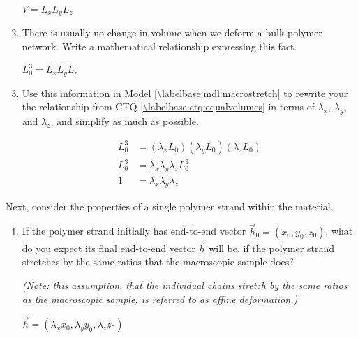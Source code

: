 \begin{activity}
\begin{ctqs}
\begin{enumerate}
		\begin{solution}[0.5in]
		
			$V = L_x L_y L_z$
		\end{solution}
	
			\item There is usually no change in volume when we deform a bulk polymer network.  Write a mathematical relationship expressing this fact.
		\label{\labelbase:ctq:equalvolumes}
	
		\begin{solution}[0.5in]
			$L_0^3 = L_x L_y L_z$
		\end{solution}
		
			\item Use this information in Model \ref{\labelbase:mdl:macrostretch} to rewrite your the relationship from CTQ \ref{\labelbase:ctq:equalvolumes} in terms of $\lambda_x$, $\lambda_y$, and $\lambda_z$, and simplify as much as possible.
	
		\begin{solution}[1.5in]
			\begin{align*}
				L_0^3 &= (\lambda_x L_0)(\lambda_y L_0)(\lambda_z L_0) \\
				L_0^3 & = \lambda_x \lambda_y \lambda_z L_0^3 \\
				1 &= \lambda_x \lambda_y \lambda_z
			\end{align*}
		\end{solution}
		
		\end{enumerate}
	
	\question Next, consider the properties of a single polymer strand within the material.
	
		\begin{enumerate}
			
			\item If the polymer strand initially has end-to-end vector $\vec h_0 = (x_0, y_0, z_0)$, what do you expect its final end-to-end vector $\vec h$ will be, if the polymer strand stretches by the same ratios that the macroscopic sample does?  
			
			\emph{(Note: this assumption, that the individual chains stretch by the same ratios as the macroscopic sample, is referred to as \emph{affine deformation}.)}
		
			\begin{solution}[1in]
				$\vec h = (\lambda_x x_0, \lambda_y y_0, \lambda_z z_0)$
			\end{solution}
			

\end{enumerate}
\end{ctqs}
\end{activity}
